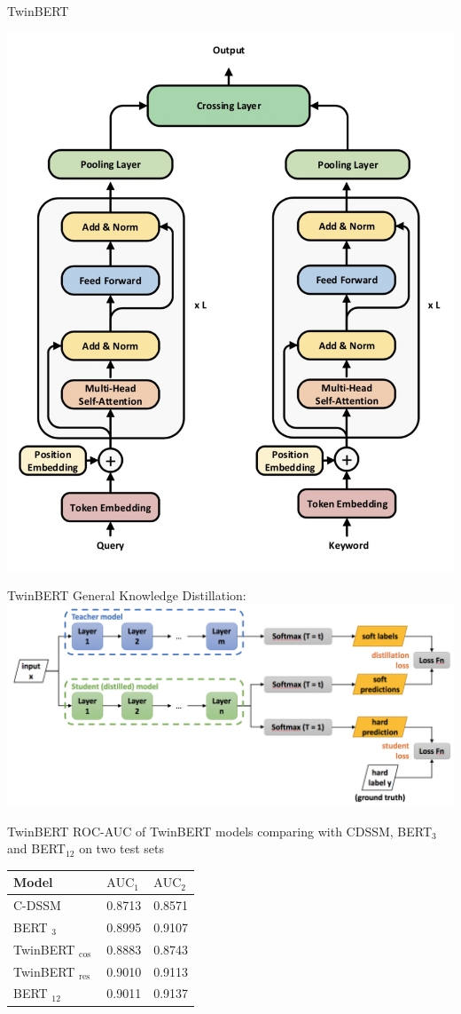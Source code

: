 \documentclass{beamer}
\begin{document}
\begin{frame}{TwinBERT}
\begin{center}
     \includegraphics[width=0.55\linewidth]{TwinBert1.png}
\end{center}

\end{frame}


\begin{frame}{TwinBERT}
General Knowledge Distillation:
    \includegraphics[width=1\linewidth]{knowledge_distillation.png}
\end{frame}

\begin{frame}{TwinBERT}
ROC-AUC of TwinBERT models comparing with CDSSM, BERT$_{3}$ and BERT$_{12}$ on two test sets
\begin{center}

\begin{tabular}{lll}
\hline Model & $\mathrm{AUC}_{1}$ & $\mathrm{AUC}_{2}$ \\
\hline C-DSSM & 0.8713 & 0.8571 \\
BERT $_{3}$ & 0.8995 & 0.9107 \\
TwinBERT $_{\text {cos }}$ & 0.8883 & 0.8743 \\
TwinBERT $_{\text {res }}$ & 0.9010 & 0.9113 \\
BERT $_{12}$ & 0.9011 & 0.9137 \\
\hline
\end{tabular}

\end{center}

\end{frame}
\end{document}
